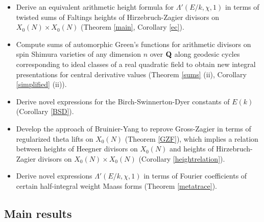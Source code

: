 \documentclass{amsart}
\theoremstyle{definition}
\theoremstyle{definition}
\theoremstyle{definition}
\begin{document}
\begin{itemize}

\item Derive an equivalent arithmetic height formula for $\Lambda'(E/k, \chi, 1)$ in terms of twisted sums of Faltings heights of 
Hirzebruch-Zagier divisors on $X_0(N)\times X_0(N)$ (Theorem \ref{main}, Corollary \ref{ec}). \\

\item Compute sums of automorphic Green's functions for arithmetic divisors on spin Shimura varieties of any dimension $n$ over ${\bf{Q}}$
along geodesic cycles corresponding to ideal classes of a real quadratic field to obtain new 
integral presentations for central derivative values (Theorem \ref{sums} (ii), Corollary \ref{simplified} (ii)). \\

\item Derive novel expressions for the Birch-Swinnerton-Dyer constants of $E(k)$ (Corollary \ref{BSD}). \\  

\item Develop the approach of Bruinier-Yang \cite[Theorem 7.7]{BY} to reprove Gross-Zagier in terms of regularized theta lifts on $X_0(N)$ (Theorem \ref{GZF}), 
which implies a relation between heights of Heegner divisors on $X_0(N)$ and heights of Hirzebruch-Zagier divisors on $X_0(N) \times X_0(N)$ (Corollary \ref{heightrelation}). \\

\item Derive novel expressions $\Lambda'(E/k, \chi, 1)$ in terms of Fourier coefficients of certain half-integral weight Maass forms (Theorem \ref{metatrace}). \\ \end{itemize}

\subsection{Main results} 
\end{document}

